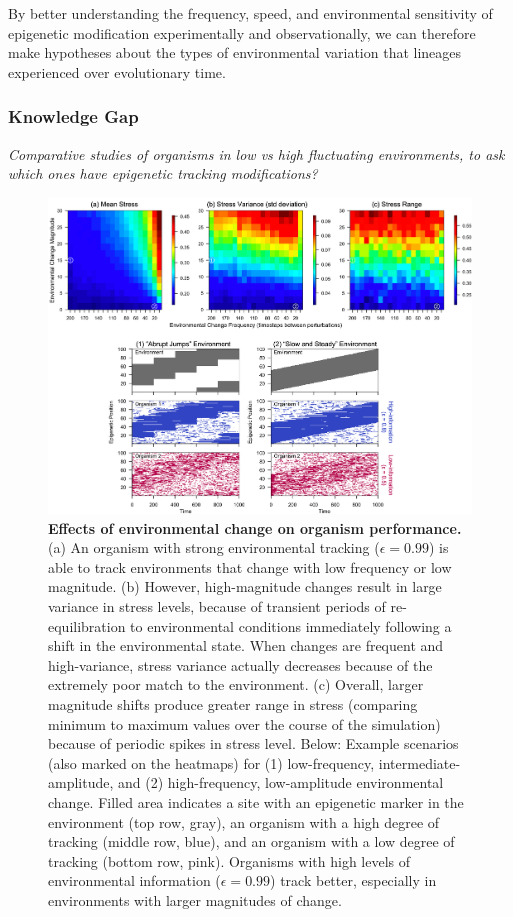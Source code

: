 \documentclass{article}
\begin{document}
By better understanding the frequency, speed, and environmental sensitivity of epigenetic modification experimentally and observationally, we can therefore make hypotheses about the types of environmental variation that lineages experienced over evolutionary time. 



\subsubsection{Knowledge Gap}

\textit{Comparative studies of organisms in low vs high fluctuating environments, to ask which ones have epigenetic tracking modifications?}

\begin{figure}
    \centering
    \includegraphics[width=\textwidth]{Figures/Fig_EnvironmentalSimulationComposite.png}
    \caption{\textbf{Effects of environmental change on organism performance.} (a) An organism with strong environmental tracking ($\epsilon = 0.99$) is able to track environments that change with low frequency or low magnitude. (b) However, high-magnitude changes result in large variance in stress levels, because of transient periods of re-equilibration to environmental conditions immediately following a shift in the environmental state. When changes are frequent and high-variance, stress variance actually decreases because of the extremely poor match to the environment. (c) Overall, larger magnitude shifts produce greater range in stress (comparing minimum to maximum values over the course of the simulation) because of periodic spikes in stress level. Below: Example scenarios (also marked on the heatmaps) for (1) low-frequency, intermediate-amplitude, and (2) high-frequency, low-amplitude environmental change. Filled area indicates a site with an epigenetic marker in the environment (top row, gray), an organism with a high degree of tracking (middle row, blue), and an organism with a low degree of tracking (bottom row, pink). Organisms with high levels of environmental information ($\epsilon = 0.99$) track better, especially in environments with larger magnitudes of change.}
    \label{fig:envirovar}
\end{figure}
\end{document}
